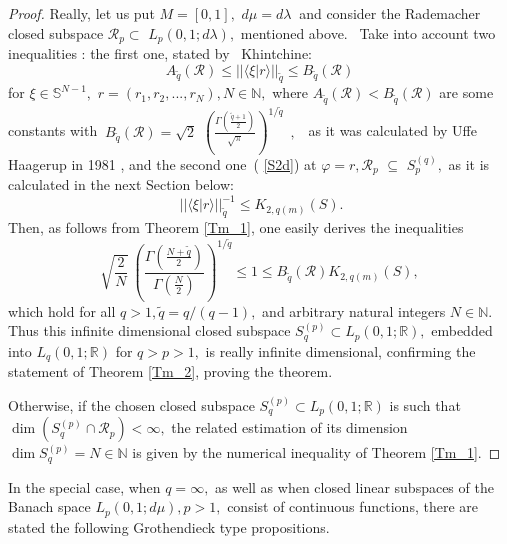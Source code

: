 \documentclass[pdflatex,sn-mathphys-num]{sn-jnl}%
\theoremstyle{thmstyleone}%
\theoremstyle{thmstyletwo}%
\theoremstyle{thmstylethree}%
\begin{document}
\begin{proof}
	Really, let us put $M=[0,1],$ $d\mu =d\lambda \ $ and consider the
	Rademacher closed subspace $\mathcal{R}_{p}\subset $ $L_{p}(0,1;d\lambda ),$
	mentioned above. \ Take into account two inequalities : the first one,
	stated by \ Khintchine: 
	\begin{equation}
		\ A_{\tilde{q}}(\mathcal{R})\leq ||\langle \xi |r\rangle ||_{\tilde{q}}\leq
		B_{\tilde{q}}(\mathcal{R})\   \label{P0}
	\end{equation}%
	for $\xi \in \mathbb{S}^{N-1},$ $r=(r_{1},r_{2},...,r_{N}),N\in \mathbb{N},$
	where $A_{\tilde{q}}(\mathcal{R})<B_{\tilde{q}}(\mathcal{R})$ are some
	constants with $\ B_{\tilde{q}}(\mathcal{R})=\sqrt{2}$ $\left( \frac{\Gamma (%
		\frac{\tilde{q}+1}{2})}{\sqrt{\pi }}\right) ^{1/\tilde{q}}$\ $,$ \ as it was
	calculated by Uffe Haagerup in 1981  \cite{Haag}, and the second one\ (%
	\ref{S2d}) at $\varphi =r,\mathcal{R}_{p}$ $\mathcal{\subseteq }$ $%
	S_{p}^{(q)},$ as it is calculated in the next Section below:%
	\begin{equation}
		\ ||\langle \xi |r\rangle ||_{\tilde{q}}^{-1}\leq K_{2,q(m)}(S).  \label{P1}
	\end{equation}%
	Then, as follows from Theorem  \ref{Tm_1}, one easily derives the
	inequalities 
	\begin{equation}
		\sqrt{\frac{2}{N}}\ \left( \frac{\Gamma (\frac{N+\tilde{q}}{2})}{\Gamma (%
			\frac{N}{2})}\right) ^{1/\tilde{q}}\leq 1\leq B_{\tilde{q}}(\mathcal{R}%
		)K_{2,q(m)}(S),  \label{P2}
	\end{equation}%
	which hold for all $q>1,\tilde{q}=q/(q-1),$ and arbitrary natural integers $%
	N\in \mathbb{N}.$ Thus this infinite dimensional closed subspace $%
	S_{q}^{(p)}\subset L_{p}(0,1;\mathbb{R}),$ embedded into $L_{q}(0,1;\mathbb{R%
	})$ for $q>p>1,$ is really infinite dimensional, confirming the statement of
	Theorem  \ref{Tm_2}, proving the theorem.
	
	Otherwise, if the chosen closed subspace $S_{q}^{(p)}\subset L_{p}(0,1;%
	\mathbb{R})$ is such that $\dim \left( S_{q}^{(p)}\cap \mathcal{R}%
	_{p}\right) <\infty ,$ the related estimation of its dimension $\dim
	S_{q}^{(p)}=N\in \mathbb{N}$ is given by the numerical inequality of Theorem
	 \ref{Tm_1}.
\end{proof}

In the special case, when $q=\infty ,$ as well as when closed linear
subspaces of the Banach space $L_{p}(0,1;d\mu ),p>1,$ consist of continuous
functions, there are stated the following Grothendieck type propositions.
\end{document}
